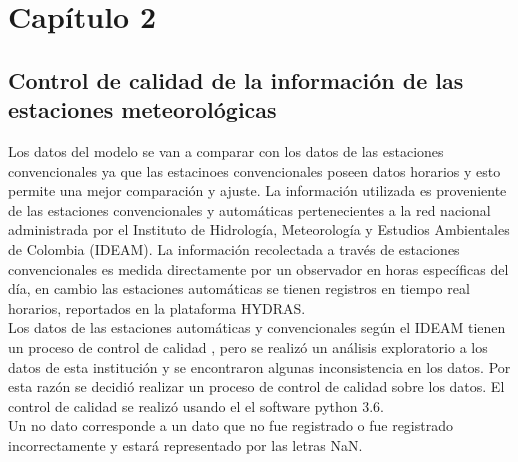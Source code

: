 \chapter{Capítulo 2}

\section{Control de calidad de la información de las estaciones meteorológicas}

Los datos del modelo se van a comparar con los datos de las estaciones convencionales ya que las estacinoes convencionales poseen datos horarios y esto permite una mejor comparación y ajuste. La información utilizada es proveniente de las estaciones convencionales y automáticas pertenecientes a la red nacional administrada por el Instituto de Hidrología, Meteorología y Estudios Ambientales de Colombia (IDEAM). La información recolectada a través de estaciones convencionales es medida directamente por un observador en horas específicas del día, en cambio las estaciones automáticas se tienen registros en tiempo real horarios, reportados en la plataforma HYDRAS.\\


Los datos de las estaciones automáticas y convencionales según el IDEAM tienen un proceso de control de calidad \citep{Torres2005}, pero se realizó un análisis exploratorio a los datos de esta institución y se encontraron algunas inconsistencia en los datos. Por esta razón se decidió realizar un proceso de control de calidad sobre los datos. El control de calidad se realizó usando el el software python 3.6.\\

Un no dato corresponde a un dato que no fue registrado o fue registrado incorrectamente y estará representado por las letras NaN.

